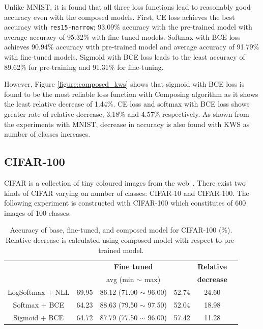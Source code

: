 \documentclass{article}
\begin{document}
Unlike MNIST, it is found that all three loss functions lead to reasonably good accuracy even with the composed models. First, CE loss achieves the best accuracy with \texttt{res15-narrow}; 93.09\% accuracy with the pre-trained model with average accuracy of 95.32\% with fine-tuned models. Softmax with BCE loss achieves 90.94\% accuracy with pre-trained model and average accuracy of 91.79\% with fine-tuned models. Sigmoid with BCE loss leads to the least accuracy of 89.62\% for pre-training and 91.31\% for fine-tuning.

However, Figure \ref{figure:composed_kws} shows that sigmoid with BCE loss is found to be the most reliable loss function with Composing algorithm as it shows the least relative decrease of 1.44\%. CE loss and softmax with BCE loss shows greater rate of relative decrease, 3.18\% and 4.57\% respectively. As shown from the experiments with MNIST, decrease in accuracy is also found with KWS as number of classes increases.

\subsection{CIFAR-100}
CIFAR is a collection of tiny coloured images from the web~\cite{krizhevsky2009learning}. There exist two kinds of CIFAR varying on number of classes: CIFAR-10 and CIFAR-100. The following experiment is constructed with CIFAR-100 which constitutes of 600 images of 100 classes.



\begin{table}[t]
    \centering
    \begin{tabular}{cccccc}
        \toprule[1pt]
        \multirow{2}{*}{\raisebox{-3\heavyrulewidth}{\bf Loss function}} &
        \multirow{2}{*}{\raisebox{-3\heavyrulewidth}{\bf Pre-trained }} &
        \textbf{Fine tuned} &
        \multirow{2}{*}{\raisebox{-3\heavyrulewidth}{ \bf Composed }} &
        \textbf{ Relative } \\
        & & avg (min $\sim$ max) & & \textbf{ decrease } \\
        \midrule
        LogSoftmax + NLL & 69.95 & 86.12 (71.00 $\sim$ 96.00) & 52.74 & 24.60 \\
        Softmax + BCE & 64.23 & 88.63 (79.50 $\sim$ 97.50) & 52.04 & 18.98 \\
        Sigmoid + BCE & 64.72 & 87.79 (77.50 $\sim$ 96.00) & 57.42 & 11.28 \\
        \bottomrule[1pt]
    \end{tabular}
    \caption{Accuracy of base, fine-tuned, and composed model for CIFAR-100 (\%). Relative decrease is calculated using composed model with respect to pre-trained model.}
    \label{table:cifar}
\end{table}
\end{document}
